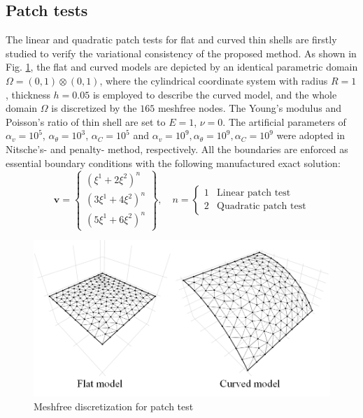 \subsection{Patch tests}
The linear and quadratic patch tests for flat and curved thin shells are firstly studied to verify the variational consistency of the proposed method. As shown in Fig. \ref{ptf1}, the flat and curved models are depicted by an identical parametric domain $\Omega = (0,1)\otimes(0,1)$, where the cylindrical coordinate system with radius $R=1$, thickness $h=0.05$ is employed to describe the curved model, and the whole domain $\Omega$ is discretized by the $165$ meshfree nodes. The Young's modulus and Poisson's ratio of thin shell are set to $E=1$, $\nu=0$. The artificial parameters of $\alpha_v=10^5$, $\alpha_\theta=10^3$, $\alpha_C=10^5$ and $\alpha_v=10^9, \alpha_\theta=10^9, \alpha_C=10^9$ were adopted in Nitsche's- and penalty- method, respectively. All the boundaries are enforced as essential boundary conditions with the following manufactured exact solution:
\begin{equation}
\boldsymbol v = \begin{Bmatrix}
(\xi^1+2\xi^2)^n \\ (3\xi^1+4\xi^2)^n \\ (5\xi^1+6\xi^2)^n
\end{Bmatrix},\quad
n = \begin{cases}
1 & \text{Linear patch test} \\
2 & \text{Quadratic patch test}
\end{cases}
\end{equation}

\begin{figure}[!ht]
    \centering
    \includegraphics[width=\textwidth]{figures/ptmsh}
    \caption{Meshfree discretization for patch test}\label{ptf1}
\end{figure}

